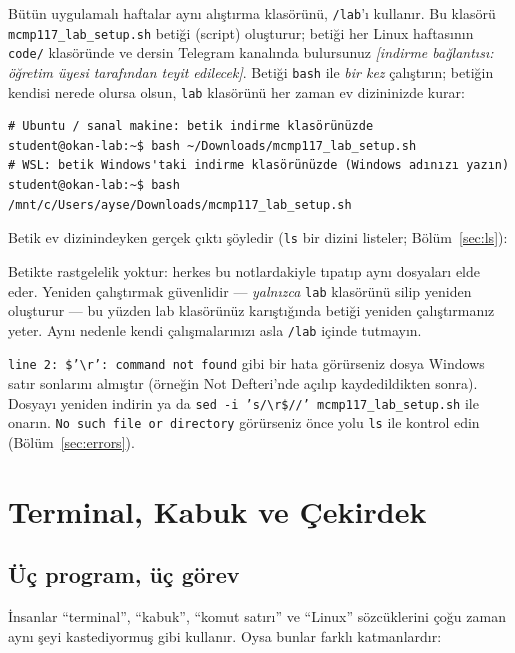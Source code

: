 \documentclass[11pt,a4paper]{article}
\newcommand{\cmd}[1]{\texttt{#1}}
\begin{document}
Bütün uygulamalı haftalar aynı alıştırma klasörünü, \texttt{\tl/lab}'ı kullanır. Bu klasörü \texttt{mcmp117\_lab\_setup.sh} betiği (script) oluşturur; betiği her Linux haftasının \texttt{code/} klasöründe ve dersin Telegram kanalında bulursunuz \emph{[indirme bağlantısı: öğretim üyesi tarafından teyit edilecek]}. Betiği \cmd{bash} ile \emph{bir kez} çalıştırın; betiğin kendisi nerede olursa olsun, \texttt{lab} klasörünü her zaman ev dizininizde kurar:

\begin{lstlisting}[style=term]
# Ubuntu / sanal makine: betik indirme klasörünüzde
student@okan-lab:~$ bash ~/Downloads/mcmp117_lab_setup.sh
# WSL: betik Windows'taki indirme klasörünüzde (Windows adınızı yazın)
student@okan-lab:~$ bash /mnt/c/Users/ayse/Downloads/mcmp117_lab_setup.sh
\end{lstlisting}

Betik ev dizinindeyken gerçek çıktı şöyledir (\cmd{ls} bir dizini listeler; Bölüm~\ref{sec:ls}):

Betikte rastgelelik yoktur: herkes bu notlardakiyle tıpatıp aynı dosyaları elde eder. Yeniden çalıştırmak güvenlidir --- \emph{yalnızca} \texttt{lab} klasörünü silip yeniden oluşturur --- bu yüzden lab klasörünüz karıştığında betiği yeniden çalıştırmanız yeter. Aynı nedenle kendi çalışmalarınızı asla \texttt{\tl/lab} içinde tutmayın.

\begin{tryit}
\texttt{line 2: \$'\textbackslash r': command not found} gibi bir hata görürseniz dosya Windows satır sonlarını almıştır (örneğin Not Defteri'nde açılıp kaydedildikten sonra). Dosyayı yeniden indirin ya da \cmd{sed -i 's/\textbackslash r\$//' mcmp117\_lab\_setup.sh} ile onarın. \texttt{No such file or directory} görürseniz önce yolu \cmd{ls} ile kontrol edin (Bölüm~\ref{sec:errors}).
\end{tryit}

\section{Terminal, Kabuk ve Çekirdek}

\subsection{Üç program, üç görev}

İnsanlar ``terminal'', ``kabuk'', ``komut satırı'' ve ``Linux'' sözcüklerini çoğu zaman aynı şeyi kastediyormuş gibi kullanır. Oysa bunlar farklı katmanlardır:
\end{document}
